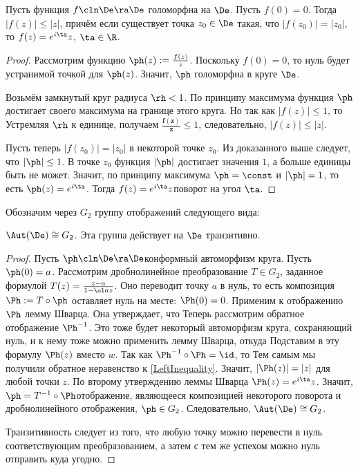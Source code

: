 \documentclass[a4paper]{article}
\begin{document}
\begin{lemma}[Шварц]
Пусть функция $f\cln\De\ra\De$ голоморфна на $\De$. Пусть $f(0)=0$.
Тогда $|f(z)|\le |z|$, причём если существует точка $z_0\in\De$ такая, что $|f(z_0)|=|z_0|$,
то $f(z)=e^{i\ta}z$, $\ta\in\R$.
\end{lemma}
\begin{proof}
Рассмотрим функцию $\ph(z) := \frac{f(z)}{z}$. Поскольку $f(0)=0$, то нуль будет устранимой точкой для $\ph(z)$.
Значит, $\ph$ голоморфна в круге $\De$.

Возьмём замкнутый круг радиуса $\rh < 1$. По принципу максимума функция $\ph$ достигает своего максимума на
границе этого круга. Но так как $|f(z)| \le 1$, то
Устремляя $\rh$ к единице, получаем $\bm{\frac{f(z)}{z}} \le 1$, следовательно, $|f(z)|\le|z|$.

Пусть теперь $|f(z_0)|=|z_0|$ в некоторой точке $z_0$. Из доказанного выше следует, что $|\ph| \le 1$.
В точке $z_0$ функция $|\ph|$ достигает значения $1$, а больше единицы быть не может. Значит, по принципу максимума $\ph=\const$
и $|\ph|=1$, то есть $\ph(z) = e^{i\ta}$. Тогда $f(z) = e^{i\ta}z$\т поворот на угол $\ta$.
\end{proof}

Обозначим через $G_2$ группу отображений следующего вида:

\begin{theorem}
$\Aut(\De) \cong G_2$. Эта группа действует на $\De$ транзитивно.
\end{theorem}
\begin{proof}
Пусть $\ph\cln\De\ra\De$\т конформный автоморфизм круга. Пусть $\ph(0)=a$. Рассмотрим дробно\д линейное преобразование
$T\in G_2$, заданное формулой $T(z) = \frac{z-a}{1-\ol a z}$. Оно переводит точку $a$ в нуль, то есть
композиция $\Ph := T \circ \ph$ оставляет нуль на месте: $\Ph(0)=0$. Применим к отображению $\Ph$ лемму Шварца.
Она утверждает, что
Теперь рассмотрим обратное отображение $\Ph^{-1}$. Это тоже будет некоторый
автоморфизм круга, сохраняющий нуль, и к нему тоже можно применить лемму Шварца, откуда
Подставим в эту формулу $\Ph(z)$ вместо $w$. Так как $\Ph^{-1} \circ \Ph = \id$, то
Тем самым мы получили обратное неравенство к \eqref{LeftInequality}. Значит, $|\Ph(z)|=|z|$ для любой точки $z$.
По второму утверждению леммы Шварца $\Ph(z)=e^{i\ta}z$. Значит, $\ph = T^{-1}\circ \Ph$\т отображение, являющееся
композицией некоторого поворота и дробно\д линейного отображения,  $\ph \in G_2$. Следовательно, $\Aut(\De) \cong G_2$.

Транзитивность следует из того, что любую точку можно перевести в нуль соответствующим преобразованием,
а затем с тем же успехом можно нуль отправить куда угодно.
\end{proof}
\end{document}
